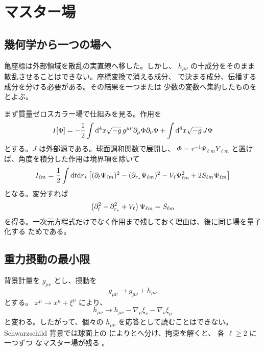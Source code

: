\chapter{マスター場}
\label{chap:master-field}

\section{幾何学から一つの場へ}

亀座標は外部領域を散乱の実直線へ移した。しかし、
$h_{\mu\nu}$ の十成分をそのまま散乱させることはできない。座標変換で消える成分、
で決まる成分、伝播する成分を分ける必要がある。その結果を一つまたは
少数の変数へ集約したものをとよぶ。

まず質量ゼロスカラー場で仕組みを見る。作用を
\begin{equation}
I[\Phi]
=
-\frac{1}{2}
\int \mathrm{d}^4x\sqrt{-g}\,
g^{\mu\nu}\partial_\mu\Phi\partial_\nu\Phi
+\int \mathrm{d}^4x\sqrt{-g}\,J\Phi
\label{eq:scalar-action}
\end{equation}
とする。$J$ は外部源である。球面調和関数で展開し、
$\Phi=r^{-1}\Psi_{\ell m}Y_{\ell m}$ と置けば、角度を積分した作用は境界項を除いて
\begin{equation}
I_{\ell m}
=
\frac{1}{2}
\int \mathrm{d} t\mathrm{d} r_*
\left[
(\partial_t\Psi_{\ell m})^2
-(\partial_{r_*}\Psi_{\ell m})^2
-V_\ell\Psi_{\ell m}^2
+2S_{\ell m}\Psi_{\ell m}
\right]
\label{eq:reduced-master-action}
\end{equation}
となる。変分すれば
\begin{equation}
\left(
\partial_t^2-\partial_{r_*}^2+V_\ell
\right)\Psi_{\ell m}
=
S_{\ell m}
\label{eq:master-action-eom}
\end{equation}
を得る。一次元方程式だけでなく作用まで残しておく理由は、後に同じ場を量子化する
ためである。

\section{重力摂動の最小限}

背景計量を $g_{\mu\nu}$ とし、摂動を
\begin{equation}
g_{\mu\nu}
\longrightarrow
g_{\mu\nu}+h_{\mu\nu}
\end{equation}
とする。 $x^\mu\to x^\mu+\xi^\mu$ により、
\begin{equation}
h_{\mu\nu}
\longrightarrow
h_{\mu\nu}
-\nabla_\mu\xi_\nu
-\nabla_\nu\xi_\mu
\label{eq:linear-gauge-transformation}
\end{equation}
と変わる。したがって、個々の $h_{\mu\nu}$ を応答として読むことはできない。
Schwarzschild 背景では球面上の  によりとへ分け、拘束を解くと、
各 $\ell\geq2$ に一つずつ  なマスター場が残る
\cite{Regge:1957td,Zerilli:1970wzz,Moncrief:1974am}。

